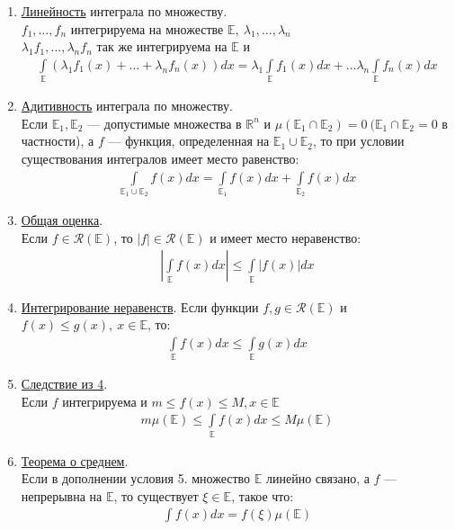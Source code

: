 \begin{enumerate}
  \item \underline{Линейность} интеграла по множеству. \\
    $f_1, \dots, f_n$ интегрируема на множестве $\mathbb{E}, \ \lambda_1, \dots, \lambda_n$
    \\
    $\lambda_1 f_1, \dots, \lambda_n f_n$ так же интегрируема на $\mathbb{E}$ и
    \begin{gather*}
      \int\limits_{\mathbb{E}} \left(\lambda_1 f_1(x) + \dots + \lambda_n
      f_n(x) \right) dx = \lambda_1 \int\limits_{\mathbb{E}} f_1(x) dx + \dots
      \lambda_n \int\limits_\mathbb{E} f_n(x) dx
    \end{gather*}
  \item \underline{Адитивность} интеграла по множеству. \\
    Если $\mathbb{E}_1, \mathbb{E}_2$ --- допустимые множества в $\mathbb{R}^n$
    и $\mu(\mathbb{E}_1 \cap \mathbb{E}_2) = 0 \ (\mathbb{E}_1 \cap \mathbb{E}_2
    = 0$ в частности), а $f$ --- функция, определенная на $\mathbb{E}_1
    \cup \mathbb{E}_2$, то при условии существования интегралов имеет место
    равенство:
    \begin{gather*}
      \int\limits_{\mathbb{E}_1 \cup \mathbb{E}_2} f(x) dx =
      \int\limits_{\mathbb{E}_1} f(x) dx + \int\limits_{\mathbb{E}_2} f(x) dx
    \end{gather*}
  \item \underline{Общая оценка}. \\
    Если $f \in \mathcal{R}(\mathbb{E})$, то $|f| \in \mathcal{R}(\mathbb{E})$ и имеет место
    неравенство:
    \begin{gather*}
      \left| \int\limits_{\mathbb{E}} f(x) dx \right| \leq
      \int\limits_{\mathbb{E}} |f(x)| dx
    \end{gather*}
  \item \underline{Интегрирование неравенств}.
    Если функции $f, g \in \mathcal{R}(\mathbb{E})$ и $f(x) \leq g(x), \ x \in
    \mathbb{E}$, то:
    \begin{gather*}
      \int\limits_\mathbb{E} f(x) dx \leq \int\limits_\mathbb{E} g(x) dx
    \end{gather*}
  \item \underline{Следствие из 4}. \\
    Если $f$ интегрируема и $m \leq f(x) \leq M, x \in \mathbb{E}$
    \begin{gather*}
      m\mu(\mathbb{E}) \leq \int\limits_\mathbb{E} f(x)dx \leq M\mu(\mathbb{E})
    \end{gather*}
  \item \underline{Теорема о среднем}. \\
    Если в дополнении условия 5. множество $\mathbb{E}$ линейно связано, а $f$
    --- непрерывна на $\mathbb{E}$, то существует $\xi \in \mathbb{E}$, такое
    что:
    \begin{gather*}
      \int f(x) dx = f(\xi) \mu(\mathbb{E})
    \end{gather*}
\end{enumerate}

